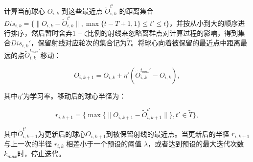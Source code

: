 \documentclass[lettersize,journal]{IEEEtran}
\begin{document}
\begin{enumerate}
    计算当前球心 \( O_{i,k} \) 到这些最近点 \( \tilde O_{i,k}^{t'} \) 的距离集合 \( Dis_{i,k}= \{ \| O_{i,k}-\tilde O_{i,k}^{t'} \|, \max\{t-T+1, 1\}\leq  t'\leq t\} \)，并按从小到大的顺序进行排序，然后暂时舍弃$1-\zeta$比例的射线来忽略离群点对计算过程的影响，得到集合${Dis}_{i,k}'$，保留射线对应轮次的集合记为$\tilde T$。将球心向着被保留的最近点中距离最远的点$\tilde{O}_{i,k}^{t_{max}'}$移动：

    \begin{equation}
    O_{i,k+1} = O_{i,k} + \eta' (\tilde{O}_{i,k}^{t_{max}'}-O_{i,k}),
    \end{equation}

    其中$\eta'$为学习率。移动后的球心半径为：

        \begin{equation}
        r_{i,k+1} =  \{ \max\{\| O_{i,k+1}-\tilde O_{i,k+1}^{t'} \|\}, t'\in \tilde T\} ,
        \end{equation}

    其中$\tilde O_{i,k+1}^{t'}$为更新后的球心$O_{i,k+1}$到被保留射线的最近点。当更新后的半径 \( r_{i,k+1} \) 与上一次的半径 \( r_{i,k} \) 相差小于一个预设的阈值 \( \lambda \)，或者达到预设的最大迭代次数$k_{max}$时，停止迭代。













\end{enumerate}
\end{document}
